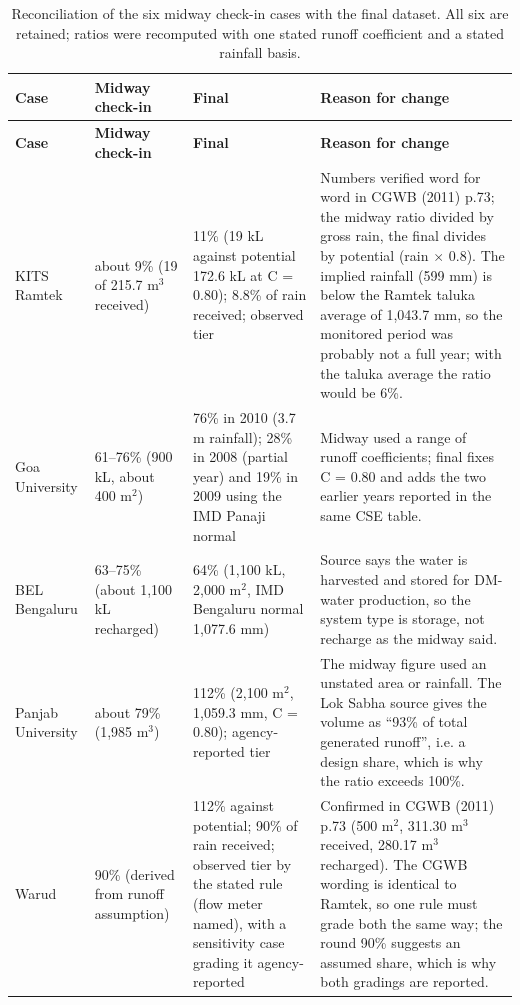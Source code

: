 {\scriptsize\setlength{\tabcolsep}{3pt}
\begin{longtable}{p{2.3cm} p{3.4cm} p{4.6cm} p{5.6cm}}
\caption{Reconciliation of the six midway check-in cases with the final dataset. All six are retained; ratios were recomputed with one stated runoff coefficient and a stated rainfall basis.}\label{tab:recon}\\
\toprule
\textbf{Case} & \textbf{Midway check-in} & \textbf{Final} & \textbf{Reason for change}\\ \midrule\endfirsthead
\toprule \textbf{Case} & \textbf{Midway check-in} & \textbf{Final} & \textbf{Reason for change}\\ \midrule\endhead
\bottomrule\endfoot
KITS Ramtek & about 9\% (19 of 215.7 m$^3$ received) & 11\% (19 kL against potential 172.6 kL at C = 0.80); 8.8\% of rain received; observed tier & Numbers verified word for word in CGWB (2011) p.73; the midway ratio divided by gross rain, the final divides by potential (rain $\times$ 0.8). The implied rainfall (599 mm) is below the Ramtek taluka average of 1,043.7 mm, so the monitored period was probably not a full year; with the taluka average the ratio would be 6\%.\\
Goa University & 61--76\% (900 kL, about 400 m$^2$) & 76\% in 2010 (3.7 m rainfall); 28\% in 2008 (partial year) and 19\% in 2009 using the IMD Panaji normal & Midway used a range of runoff coefficients; final fixes C = 0.80 and adds the two earlier years reported in the same CSE table.\\
BEL Bengaluru & 63--75\% (about 1,100 kL recharged) & 64\% (1,100 kL, 2,000 m$^2$, IMD Bengaluru normal 1,077.6 mm) & Source says the water is harvested and stored for DM-water production, so the system type is storage, not recharge as the midway said.\\
Panjab University & about 79\% (1,985 m$^3$) & 112\% (2,100 m$^2$, 1,059.3 mm, C = 0.80); agency-reported tier & The midway figure used an unstated area or rainfall. The Lok Sabha source gives the volume as ``93\% of total generated runoff'', i.e. a design share, which is why the ratio exceeds 100\%.\\
Warud & 90\% (derived from runoff assumption) & 112\% against potential; 90\% of rain received; observed tier by the stated rule (flow meter named), with a sensitivity case grading it agency-reported & Confirmed in CGWB (2011) p.73 (500 m$^2$, 311.30 m$^3$ received, 280.17 m$^3$ recharged). The CGWB wording is identical to Ramtek, so one rule must grade both the same way; the round 90\% suggests an assumed share, which is why both gradings are reported.\\

\end{longtable}}
